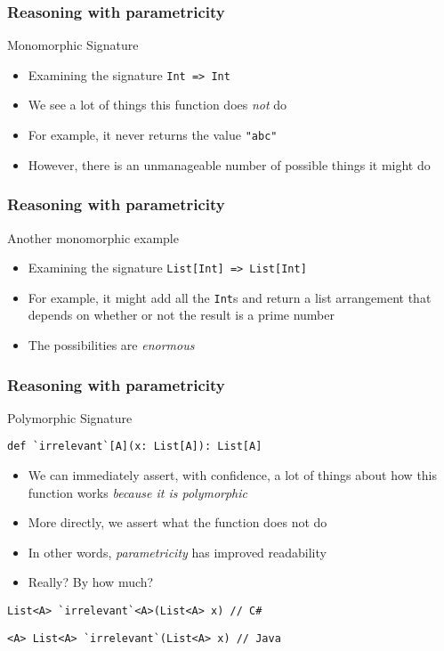 \begin{frame}[fragile]
\frametitle{Reasoning with parametricity}
\begin{block}{Monomorphic Signature}
\begin{itemize}
  \item Examining the signature \lstinline[style=scala]{Int => Int}
  \item We see a lot of things this function does \emph{not} do
  \item For example, it never returns the value \lstinline[style=scala]{"abc"}
  \item However, there is an unmanageable number of possible things it might do
\end{itemize}
\end{block}
\end{frame}

\begin{frame}[fragile]
\frametitle{Reasoning with parametricity}
\begin{block}{Another monomorphic example}
\begin{itemize}
  \item Examining the signature \lstinline[style=scala]{List[Int] => List[Int]}
  \item For example, it might add all the \lstinline{Int}s and return a list arrangement that depends on whether or not the result is a prime number
  \item The possibilities are \emph{enormous}
\end{itemize}
\end{block}
\end{frame}

\begin{frame}[fragile]
\frametitle{Reasoning with parametricity}
\begin{block}{Polymorphic Signature}
\begin{lstlisting}[style=scala]
def `irrelevant`[A](x: List[A]): List[A]
\end{lstlisting}
\begin{itemize}
  \item We can immediately assert, with confidence, a lot of things about how this function works \emph{because it is polymorphic}
  \item More directly, we assert what the function does not do
  \item<2> In other words, \emph{parametricity} has improved readability
  \item<2> Really? By how much?
\end{itemize}
\end{block}
\tiny{
\begin{lstlisting}
List<A> `irrelevant`<A>(List<A> x) // C#
\end{lstlisting}
\begin{lstlisting}
<A> List<A> `irrelevant`(List<A> x) // Java
\end{lstlisting}
}
\end{frame}

